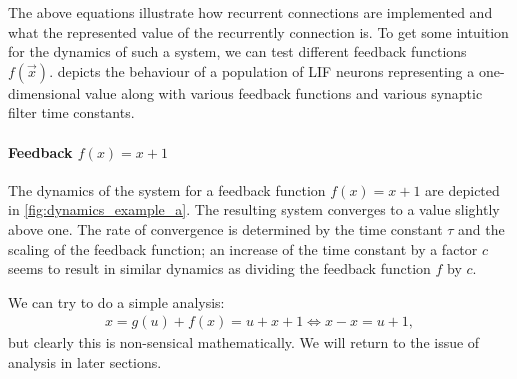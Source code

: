 \documentclass[10pt,letterpaper,oneside]{article}
\begin{document}
The above equations illustrate how recurrent connections are implemented and what the represented value of the recurrently connection is. To get some intuition for the dynamics of such a system, we can test different feedback functions $f(\vec x)$.  depicts the behaviour of a population of LIF neurons representing a one-dimensional value along with various feedback functions and various synaptic filter time constants.


\paragraph{Feedback $f(x) = x + 1$}
The dynamics of the system for a feedback function $f(x) = x + 1$ are depicted in \cref{fig:dynamics_example_a}. The resulting system converges to a value slightly above one. The rate of convergence is determined by the time constant $\tau$ and the scaling of the feedback function; an increase of the time constant by a factor $c$ seems to result in similar dynamics as dividing the feedback function $f$ by $c$.

We can try to do a simple analysis:
\begin{align*}
  x = g(u) + f(x) = u + x + 1 \Leftrightarrow x-x=u+1,
\end{align*}
but clearly this is non-sensical mathematically. We will return to the issue of analysis in later sections.
\end{document}
